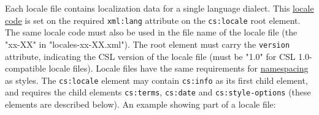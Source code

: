Each locale file contains localization data for a single language
dialect. This
\href{http://books.xmlschemata.org/relaxng/ch19-77191.html}{locale code}
is set on the required \texttt{xml:lang} attribute on the
\texttt{cs:locale} root element. The same locale code must also be used
in the file name of the locale file (the "xx-XX" in
"locales-xx-XX.xml"). The root element must carry the \texttt{version}
attribute, indicating the CSL version of the locale file (must be "1.0"
for CSL 1.0-compatible locale files). Locale files have the same
requirements for \protect\hyperlink{namespacing}{namespacing} as styles.
The \texttt{cs:locale} element may contain \texttt{cs:info} as its first
child element, and requires the child elements \texttt{cs:terms},
\texttt{cs:date} and \texttt{cs:style-options} (these elements are
described below). An example showing part of a locale file:

